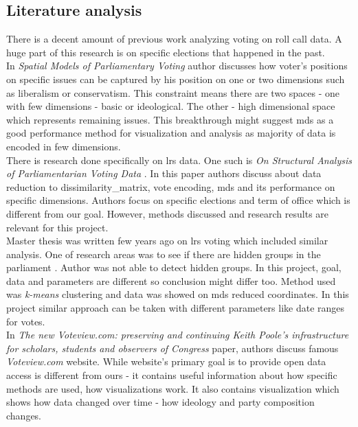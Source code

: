 \documentclass[a4paper,12pt]{article}
\begin{document}
   	\subsection{Literature analysis}
   	
	There is a decent amount of previous work analyzing voting on roll call data. A huge part of this research is on specific elections that happened in the past.\\	
	
	In \textit{Spatial Models of Parliamentary Voting} \cite{poole_2005} author discusses how voter's positions on specific issues can be captured by his position on one or two dimensions such as liberalism or conservatism. This constraint means there are two spaces - one with few dimensions - basic  or ideological. The other - high dimensional space which represents remaining issues. This breakthrough might suggest \acrlong{mds} as a good performance method for visualization and analysis as majority of data is encoded in few dimensions.\\
	
	
	There is research done specifically on \gls{lrs} data. One such is \textit{On Structural Analysis of Parliamentarian Voting Data} \cite{DBLP:journals/informaticaLT/KrilaviciusZ08}. In this paper authors discuss about data reduction to \gls{dissimilarity_matrix}, vote encoding, \gls{mds} and its performance on specific dimensions. Authors focus on specific elections and term of office which is different from our goal. However, methods discussed and research results are relevant for this project.\\
	
	Master thesis was written few years ago on \gls{lrs} voting which included similar analysis. One of research areas was to see if there are hidden groups in the parliament \cite{vytautas_mick_magistrinis}. Author was not able to detect hidden groups. In this project, goal, data and parameters are different so conclusion might differ too. Method used was \textit{k-means} clustering and data was showed on \gls{mds} reduced coordinates. In this project similar approach can be taken with different parameters like date ranges for votes.  \\
	
	In \textit{The new Voteview.com: preserving and continuing Keith Poole’s infrastructure for scholars, students and observers of Congress} \cite{article} paper, authors discuss famous \textit{Voteview.com} website. While website's primary goal is to provide open data access is different from ours - it contains useful information about how specific methods are used, how visualizations work. It also contains visualization which shows how data changed over time - how ideology and party composition changes.
	
\end{document}
